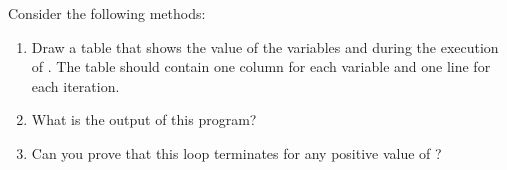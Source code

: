 \begin{exercise}

Consider the following methods:


\begin{enumerate}

\item Draw a table that shows the value of the variables  and  during the execution of .
The table should contain one column for each variable and one line for each iteration.

\item What is the output of this program?

\item Can you prove that this loop terminates for any positive value of ?



\end{enumerate}

\end{exercise}


